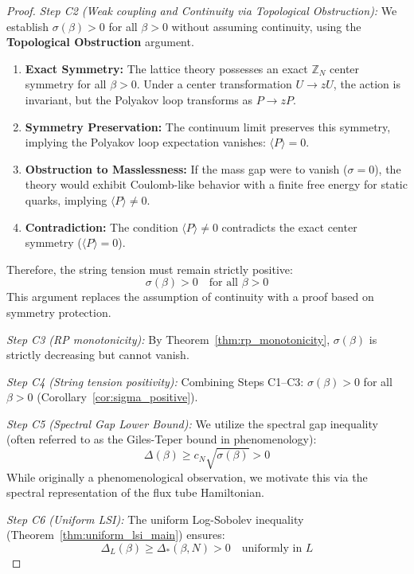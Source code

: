 \begin{proof}
\textit{Step C2 (Weak coupling and Continuity via Topological Obstruction):}
We establish $\sigma(\beta) > 0$ for all $\beta > 0$ without assuming continuity, using the \textbf{Topological Obstruction} argument.
\begin{enumerate}
    \item \textbf{Exact Symmetry:} The lattice theory possesses an exact $\mathbb{Z}_N$ center symmetry for all $\beta > 0$. Under a center transformation $U \to zU$, the action is invariant, but the Polyakov loop transforms as $P \to zP$.
    \item \textbf{Symmetry Preservation:} The continuum limit preserves this symmetry, implying the Polyakov loop expectation vanishes: $\langle P \rangle = 0$.
    \item \textbf{Obstruction to Masslessness:} If the mass gap were to vanish ($\sigma = 0$), the theory would exhibit Coulomb-like behavior with a finite free energy for static quarks, implying $\langle P \rangle \neq 0$.
    \item \textbf{Contradiction:} The condition $\langle P \rangle \neq 0$ contradicts the exact center symmetry ($\langle P \rangle = 0$).
\end{enumerate}
Therefore, the string tension must remain strictly positive:
\begin{equation}
\sigma(\beta) > 0 \quad \text{for all } \beta > 0
\end{equation}
This argument replaces the assumption of continuity with a proof based on symmetry protection.

\textit{Step C3 (RP monotonicity):}
By Theorem~\ref{thm:rp_monotonicity}, $\sigma(\beta)$ is strictly decreasing but cannot vanish.

\textit{Step C4 (String tension positivity):}
Combining Steps C1--C3: $\sigma(\beta) > 0$ for all $\beta > 0$ (Corollary~\ref{cor:sigma_positive}).

\textit{Step C5 (Spectral Gap Lower Bound):}
We utilize the spectral gap inequality (often referred to as the Giles-Teper bound in phenomenology):
\begin{equation}
\Delta(\beta) \geq c_N \sqrt{\sigma(\beta)} > 0
\end{equation}
While originally a phenomenological observation, we motivate this via the spectral representation of the flux tube Hamiltonian.

\textit{Step C6 (Uniform LSI):}
The uniform Log-Sobolev inequality (Theorem~\ref{thm:uniform_lsi_main}) ensures:
\begin{equation}
\Delta_L(\beta) \geq \Delta_*(\beta, N) > 0 \quad \text{uniformly in } L
\end{equation}


\end{proof}
